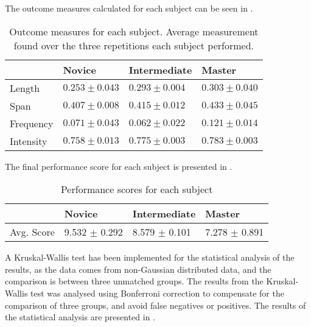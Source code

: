 

The outcome measures calculated for each subject can be seen in .

\begin{table}[h]
	\begin{tabular}{|l|l|l|l|}
		\hline
		& Novice            & Intermediate      & Master            \\ \hline
		Length    & $0.253 \pm 0.043$ & $0.293 \pm 0.004$ & $0.303 \pm 0.040$ \\ \hline
		Span      & $0.407 \pm 0.008$ & $0.415 \pm 0.012$ & $0.433 \pm 0.045$ \\ \hline
		Frequency & $0.071 \pm 0.043$ & $0.062 \pm 0.022$ & $0.121 \pm 0.014$ \\ \hline
		Intensity & $0.758 \pm 0.013$ & $0.775 \pm 0.003$ & $0.783 \pm 0.003$ \\ \hline
	\end{tabular}
	\caption{Outcome measures for each subject. Average measurement found over the three repetitions each subject performed.}
	\label{tab:measures}
\end{table}

The final performance score for each subject is presented in .

\begin{table}[h]
	\begin{tabular}{|l|l|l|l|}
		\hline
				          & Novice                     & Intermediate           & Master                   \\  \hline
		Avg. Score & 9.532 $\pm$ 0.292 & 8.579 $\pm$ 0.101 & 7.278 $\pm$ 0.891 \\ \hline
	\end{tabular}
\caption{Performance scores for each subject}
\label{tab:scores}
\end{table}

A Kruskal-Wallis test has been implemented for the statistical analysis of the results, as the data comes from non-Gaussian distributed data, and the comparison is between three unmatched groups. The results from the Kruskal-Wallis test was analysed using Bonferroni correction to compensate for the comparison of three groups, and avoid false negatives or positives. The results of the statistical analysis are presented in .


